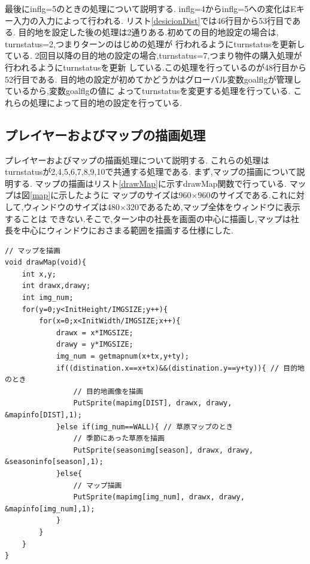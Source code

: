 \documentclass[a4j]{jarticle}
\begin{document}
            最後にinflg=5のときの処理について説明する. inflg=4からinflg=5への変化はEキー入力の入力によって行われる.
            リスト\ref{desicionDist}では46行目から53行目である.
            目的地を設定した後の処理は2通りある.初めての目的地設定の場合は, turnstatus=2,つまりターンのはじめの処理が
            行われるようにturnstatusを更新している. 2回目以降の目的地の設定の場合,turnstatus=7,つまり物件の購入処理が行われるようにturnstatusを更新
            している.この処理を行っているのが48行目から52行目である. 目的地の設定が初めてかどうかはグローバル変数goalflgが管理しているから,変数goalflgの値に
            よってturnstatusを変更する処理を行っている. これらの処理によって目的地の設定を行っている.

    \subsection{プレイヤーおよびマップの描画処理}
    プレイヤーおよびマップの描画処理について説明する. これらの処理はturnstatusが2,4,5,6,7,8,9,10で共通する処理である.
    まず,マップの描画について説明する. マップの描画はリスト\ref{drawMap}に示すdrawMap関数で行っている. マップは図\ref{map}に示したように
    マップのサイズは960$\times$960のサイズである.これに対して,ウィンドウのサイズは480$\times$320であるため,マップ全体をウィンドウに表示することは
    できない.そこで,ターン中の社長を画面の中心に描画し,マップは社長を中心にウィンドウにおさまる範囲を描画する仕様にした.\\
        \begin{lstlisting}[basicstyle=\ttfamily\footnotesize, frame=single,label=drawMap,caption=drawMap関数]
// マップを描画
void drawMap(void){
    int x,y;
    int drawx,drawy;
    int img_num;
    for(y=0;y<InitHeight/IMGSIZE;y++){
        for(x=0;x<InitWidth/IMGSIZE;x++){
            drawx = x*IMGSIZE;
            drawy = y*IMGSIZE;
            img_num = getmapnum(x+tx,y+ty);
            if((distination.x==x+tx)&&(distination.y==y+ty)){ // 目的地のとき
                // 目的地画像を描画
                PutSprite(mapimg[DIST], drawx, drawy, &mapinfo[DIST],1);
            }else if(img_num==WALL){ // 草原マップのとき
                // 季節にあった草原を描画
                PutSprite(seasonimg[season], drawx, drawy, &seasoninfo[season],1);
            }else{
                // マップ描画
                PutSprite(mapimg[img_num], drawx, drawy, &mapinfo[img_num],1);
            }
        }
    }
}
        \end{lstlisting}
\end{document}
